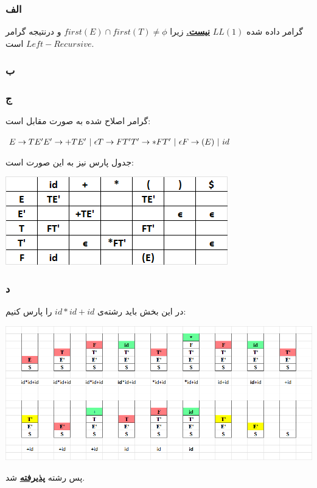 \subsubsection*{الف}
گرامر داده شده 
$LL(1)$
\textbf{\underline{نیست.}}
زیرا 
$first(E)\cap first(T) \neq \phi$
و درنتیجه گرامر 
$Left-Recursive$
است.

\subsubsection*{ب}


\subsubsection*{ج}
گرامر اصلاح شده به صورت مقابل است:

\setLTR
$
E \rightarrow TE' \\ 
E' \rightarrow +TE' \ | \ \epsilon \\
T \rightarrow FT' \\
T' \rightarrow *FT' \ | \ \epsilon \\
F \rightarrow (E) \ | \ id
$
\setRTL

جدول پارس نیز به این صورت است:

\qquad\qquad\qquad\qquad\qquad\includegraphics[width=0.5\linewidth]{figs/3.png}

\pagebreak
\subsubsection*{د}

در این بخش باید رشته‌ی 
$id *id+id$
را پارس کنیم:

\qquad\qquad\qquad\qquad\qquad\includegraphics[width=1\linewidth]{figs/4.png}

پس رشته 
\textbf{\underline{پذیرفته}}
 شد.
